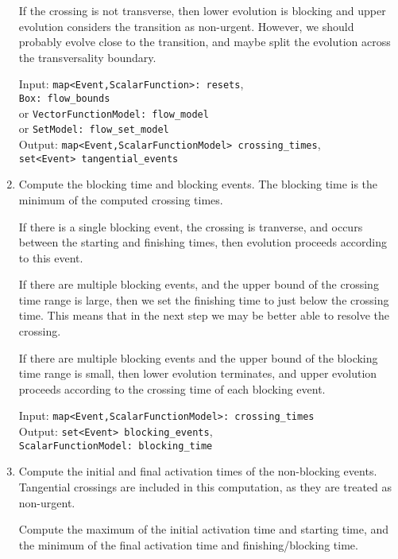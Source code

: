 \documentclass[english,a4paper]{article}
\theoremstyle{theorem}
\theoremstyle{definition}
\theoremstyle{remark}
\begin{document}
\begin{enumerate}
If the crossing is not transverse, then lower evolution is blocking
and upper evolution considers the transition as non-urgent. However,
we should probably evolve close to the transition, and maybe split
the evolution across the transversality boundary.

\begin{tabbing}
Input: \= \texttt{map<Event,ScalarFunction>:\ resets}, \\
       \> \texttt{Box:\ flow\_bounds} \\
       \> \quad or \texttt{VectorFunctionModel:\ flow\_model} \\
       \> \quad or \texttt{SetModel:\ flow\_set\_model} \\
Output: \= \texttt{map<Event,ScalarFunctionModel>\ crossing\_times}, \\
        \> \texttt{set<Event>\ tangential\_events}
\end{tabbing}

\item Compute the blocking time and blocking events. The blocking time is
the minimum of the computed crossing times.

If there is a single  blocking event, the crossing is tranverse, and
occurs between the starting and finishing times, then evolution
proceeds according to this event.

If there are multiple blocking events, and the upper bound of the
crossing time range is large, then we set the finishing time to
just below the crossing time. This means that in the next step
we may be better able to resolve the crossing.

If there are multiple blocking events and the upper bound of the
blocking time range is small, then lower evolution terminates, and
upper evolution proceeds according to the crossing time of each
blocking event.

\begin{tabbing}
Input: \= \texttt{map<Event,ScalarFunctionModel>:\ crossing\_times} \\
Output: \= \texttt{set<Event>\ blocking\_events}, \\
        \> \texttt{ScalarFunctionModel:\ blocking\_time}
\end{tabbing}

\item Compute the initial and final activation times of the non-blocking
events. Tangential crossings are included in this computation,
as they are treated as non-urgent.

Compute the maximum of the initial activation time and starting time,
and the minimum of the final activation time and finishing/blocking
time.


\end{enumerate}
\end{document}
